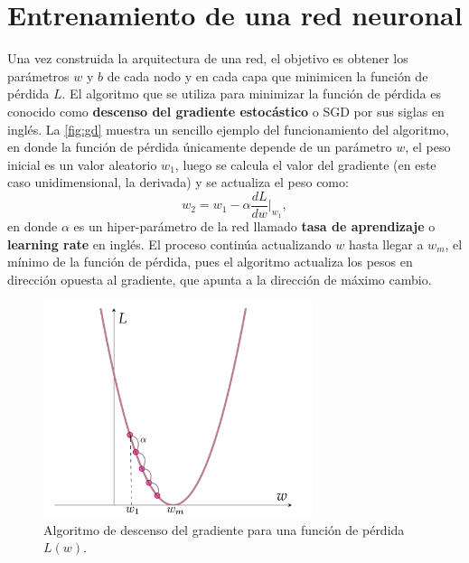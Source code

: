 \section{Entrenamiento de una red neuronal}\label{sec:TrainNN}
Una vez construida la arquitectura de una red, el objetivo es obtener los parámetros $w$ y $b$ de cada nodo y en cada capa que minimicen la función de pérdida $L$. El algoritmo que se utiliza para minimizar la función de pérdida es conocido como \textbf{descenso del gradiente estocástico} \cite{Robbins1951ASA} o SGD por sus siglas en inglés. La \autoref{fig:gd} muestra un sencillo ejemplo del funcionamiento del algoritmo, en donde la función de pérdida únicamente depende de un parámetro $w$, el peso inicial es un valor aleatorio $w_1$, luego se calcula el valor del gradiente (en este caso unidimensional, la derivada) y se actualiza el peso como:
$$w_2 = w_1 - \alpha \frac{dL}{dw}\bigg|_{w_1},$$
en donde $\alpha$ es un hiper-parámetro de la red llamado \textbf{tasa de aprendizaje} o \textbf{learning rate} en inglés. El proceso continúa actualizando $w$ hasta llegar a $w_m$, el mínimo de la función de pérdida, pues el algoritmo actualiza los pesos en dirección opuesta al gradiente, que apunta a la dirección de máximo cambio.

\begin{figure}[h]
  \centering
  \includegraphics[width=0.7\textwidth]{./img/GD.png}
\caption{Algoritmo de descenso del gradiente para una función de pérdida $L(w)$.}
\label{fig:gd}
\end{figure}

